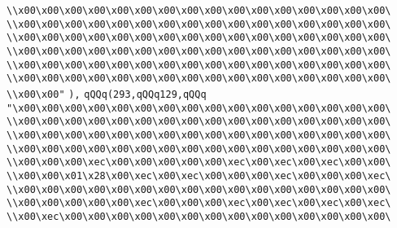 \verb|\\x00\x00\x00\x00\x00\x00\x00\x00\x00\x00\x00\x00\x00\x00\x00\x00\|\newline
\verb|\\x00\x00\x00\x00\x00\x00\x00\x00\x00\x00\x00\x00\x00\x00\x00\x00\|\newline
\verb|\\x00\x00\x00\x00\x00\x00\x00\x00\x00\x00\x00\x00\x00\x00\x00\x00\|\newline
\verb|\\x00\x00\x00\x00\x00\x00\x00\x00\x00\x00\x00\x00\x00\x00\x00\x00\|\newline
\verb|\\x00\x00\x00\x00\x00\x00\x00\x00\x00\x00\x00\x00\x00\x00\x00\x00\|\newline
\verb|\\x00\x00\x00\x00\x00\x00\x00\x00\x00\x00\x00\x00\x00\x00\x00\x00\|\newline
\verb|\\x00\x00"|\newline
\verb|),|\newline
\verb|qQQq(293,qQQq129,qQQq|\newline
\verb|"\x00\x00\x00\x00\x00\x00\x00\x00\x00\x00\x00\x00\x00\x00\x00\x00\|\newline
\verb|\\x00\x00\x00\x00\x00\x00\x00\x00\x00\x00\x00\x00\x00\x00\x00\x00\|\newline
\verb|\\x00\x00\x00\x00\x00\x00\x00\x00\x00\x00\x00\x00\x00\x00\x00\x00\|\newline
\verb|\\x00\x00\x00\x00\x00\x00\x00\x00\x00\x00\x00\x00\x00\x00\x00\x00\|\newline
\verb|\\x00\x00\x00\xec\x00\x00\x00\x00\x00\xec\x00\xec\x00\xec\x00\x00\|\newline
\verb|\\x00\x00\x01\x28\x00\xec\x00\xec\x00\x00\x00\xec\x00\x00\x00\xec\|\newline
\verb|\\x00\x00\x00\x00\x00\x00\x00\x00\x00\x00\x00\x00\x00\x00\x00\x00\|\newline
\verb|\\x00\x00\x00\x00\x00\xec\x00\x00\x00\xec\x00\xec\x00\xec\x00\xec\|\newline
\verb|\\x00\xec\x00\x00\x00\x00\x00\x00\x00\x00\x00\x00\x00\x00\x00\x00\|\newline
